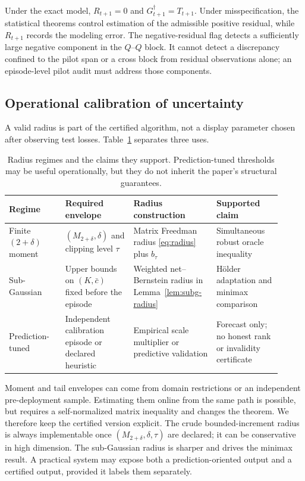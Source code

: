 Under the exact model, $R_{t+1}=0$ and $G_{t+1}^\dagger=T_{t+1}$.  Under misspecification, the statistical theorems control estimation of the admissible positive residual, while $R_{t+1}$ records the modeling error.  The negative-residual flag detects a sufficiently large negative component in the $Q$--$Q$ block.  It cannot detect a discrepancy confined to the pilot span or a cross block from residual observations alone; an episode-level pilot audit must address those components.

\subsection{Operational calibration of uncertainty}

A valid radius is part of the certified algorithm, not a display parameter chosen after observing test losses.  Table~\ref{tab:radius-regimes} separates three uses.

\begin{table}[t]
\caption{Radius regimes and the claims they support.  Prediction-tuned thresholds may be useful operationally, but they do not inherit the paper's structural guarantees.}
\label{tab:radius-regimes}
\centering
\small
\begin{tabular}{p{0.19\linewidth}p{0.23\linewidth}p{0.27\linewidth}p{0.22\linewidth}}
\toprule
Regime & Required envelope & Radius construction & Supported claim \\
\midrule
Finite $(2+\delta)$ moment
& $(M_{2+\delta},\delta)$ and clipping level $\tau$
& Matrix Freedman radius \eqref{eq:radius} plus $b_\tau$
& Simultaneous robust oracle inequality \\
Sub-Gaussian
& Upper bounds on $(K,\bar c)$ fixed before the episode
& Weighted net--Bernstein radius in Lemma~\ref{lem:subg-radius}
& H\"older adaptation and minimax comparison \\
Prediction-tuned
& Independent calibration episode or declared heuristic
& Empirical scale multiplier or predictive validation
& Forecast only; no honest rank or invalidity certificate \\
\bottomrule
\end{tabular}
\end{table}

Moment and tail envelopes can come from domain restrictions or an independent pre-deployment sample.  Estimating them online from the same path is possible, but requires a self-normalized matrix inequality and changes the theorem.  We therefore keep the certified version explicit.  The crude bounded-increment radius is always implementable once $(M_{2+\delta},\delta,\tau)$ are declared; it can be conservative in high dimension.  The sub-Gaussian radius is sharper and drives the minimax result.  A practical system may expose both a prediction-oriented output and a certified output, provided it labels them separately.


